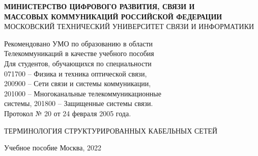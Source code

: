 \begin{titlepage}
\begin{center}
    \MakeUppercase{{\bf Министерство цифрового развития, связи и \\
    массовых коммуникаций Российской федерации}\\
    Московский Технический Университет Связи И Информатики}\\
    \bigskip
    \begin{flushright}
        \begin{minipage}{0.4\textwidth}
            \tiny{
                Рекомендовано УМО по образованию в области\\
                Телекоммуникаций в качестве учебного пособия\\
                Для студентов, обучающихся по специальности\\
                071700 -- Физика и техника оптической связи,\\
                200900 -- Сети связи и системы коммуникации,\\
                201000 -- Многоканальные телекоммуникационные\\
                системы, 201800 -- Защищенные системы связи.\\
                Протокол № 20 от 24 февраля 2005 года.
            }
        \end{minipage}
    \end{flushright}
    \vfill
    \MakeUppercase{Терминология структурированных кабельных сетей}
    \par\par
    Учебное пособие
    \vfill\vfill
    {Москва, 2022}
\end{center}
\end{titlepage}